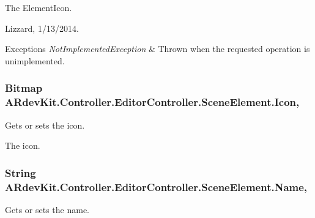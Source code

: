 The Element\-Icon. 

Lizzard, 1/13/2014. 


\begin{DoxyExceptions}{Exceptions}
{\em Not\-Implemented\-Exception} & Thrown when the requested operation is unimplemented. \\
\hline
\end{DoxyExceptions}
\hypertarget{class_a_rdev_kit_1_1_controller_1_1_editor_controller_1_1_scene_element_ac20376b4582ba5df3b65aaf2c4f84b9b}{
\subsubsection[{Icon}]{\setlength{\rightskip}{0pt plus 5cm}Bitmap A\-Rdev\-Kit.\-Controller.\-Editor\-Controller.\-Scene\-Element.\-Icon\hspace{0.3cm}{\ttfamily [get]}, {\ttfamily [set]}}}\label{class_a_rdev_kit_1_1_controller_1_1_editor_controller_1_1_scene_element_ac20376b4582ba5df3b65aaf2c4f84b9b}


Gets or sets the icon. 

The icon. \hypertarget{class_a_rdev_kit_1_1_controller_1_1_editor_controller_1_1_scene_element_a815f4b956410f110fa82889e863e6800}{
\subsubsection[{Name}]{\setlength{\rightskip}{0pt plus 5cm}String A\-Rdev\-Kit.\-Controller.\-Editor\-Controller.\-Scene\-Element.\-Name\hspace{0.3cm}{\ttfamily [get]}, {\ttfamily [set]}}}\label{class_a_rdev_kit_1_1_controller_1_1_editor_controller_1_1_scene_element_a815f4b956410f110fa82889e863e6800}


Gets or sets the name. 

